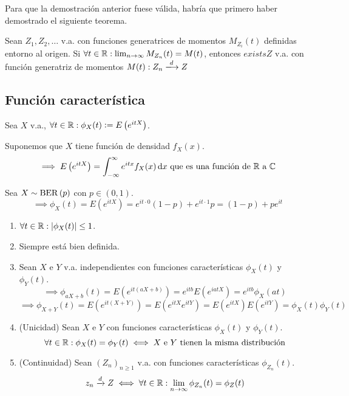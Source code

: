 Para que la demostración anterior fuese válida, habría que primero haber demostrado el siguiente teorema.
\begin{teo}
	Sean $Z_1, Z_2, \dots$ v.a. con funciones generatrices de momentos $M_{Z_i}(t)$ definidas entorno al origen. Si $\forall t \in \mathbb{R} : \lim_{n\to\infty} M_{Z_n}(t) = M(t)$, entonces $exists Z$ v.a. con función generatriz de momentos $M(t) : Z_n \xlongrightarrow{d} Z$
\end{teo}

\subsection{Función característica}

\begin{defn}
	Sea $X$ v.a., $\forall t \in \mathbb{R} : \phi_X(t) \vcentcolon= E\left(e^{itX}\right)$.
\end{defn}

 Suponemos que $X$ tiene función de densidad $f_X(x)$.
\[\implies E\left(e^{itX}\right) = \int_{-\infty}^{\infty} e^{itx}f_X(x)\odif{x} \tex{ que es una función de $\R$ a $\C$}\]

\begin{ejem}
	Sea $X\sim\operatorname{BER}\left(p\right)$ con $p\in(0,1)$.
	\[\implies \phi_X(t) = E\left(e^{itX}\right) = e^{it\cdot 0}(1-p) + e^{it\cdot 1}p = (1-p) + p e^{it}\] %
\end{ejem}

\begin{enumerate}
	\item $\displaystyle \forall t \in \mathbb{R} : \left|\phi_X(t)\right| \leq 1$.
	\item Siempre está bien definida.
	\item Sean $X$ e $Y$ v.a. independientes con funciones características $\phi_X(t)$ y $\phi_Y(t)$.
	      \[\implies \phi_{aX+b}(t) = E\left(e^{it(aX+b)}\right) = e^{itb}E\left(e^{iatX}\right) = e^{itb}\phi_X(at)\]
	      \[\implies \phi_{X+Y}(t) = E\left(e^{it(X+Y)}\right) = E\left(e^{itX}e^{itY}\right) = E\left(e^{itX}\right)E\left(e^{itY}\right) = \phi_X(t)\phi_Y(t)\]
	\item (Unicidad) Sean $X$ e $Y$ con funciones características $\phi_X(t)$ y $\phi_Y(t)$.
	      \[\forall t \in \mathbb{R} :  \phi_X(t) = \phi_Y(t) \iff \text{$X$ e $Y$ tienen la misma distribución}\]
	\item (Continuidad) Sean $\left(Z_n\right)_{n\geq 1}$ v.a. con funciones características $\phi_{Z_n}(t)$.
	      \[z_n \xrightarrow{d} Z \iff \forall t \in \mathbb{R} : \lim_{n\to\infty} \phi_{Z_n}(t) = \phi_Z(t)\]
\end{enumerate}

